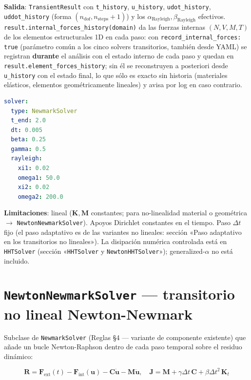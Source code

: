 \documentclass[11pt,oneside]{report}
\begin{document}
\textbf{Salida}: \texttt{TransientResult} con \texttt{t\_history}, \texttt{u\_history}, \texttt{udot\_history}, \texttt{uddot\_history} (forma $(n_{\text{dof}}, n_{\text{steps}} + 1)$) y los $\alpha_{\text{Rayleigh}}, \beta_{\text{Rayleigh}}$ efectivos. \texttt{result.\allowbreak{}internal\_\allowbreak{}forces\_\allowbreak{}history(domain)} da las fuerzas internas $(N, V, M, T)$ de los elementos estructurales 1D en cada paso: con \texttt{record\_\allowbreak{}internal\_\allowbreak{}forces: true} (parámetro común a los cinco solvers transitorios, también desde YAML) se registran \textbf{durante} el análisis con el estado interno de cada paso y quedan en \texttt{result.\allowbreak{}element\_\allowbreak{}forces\_\allowbreak{}history}; sin él se reconstruyen a posteriori desde \texttt{u\_history} con el estado final, lo que sólo es exacto sin historia (materiales elásticos, elementos geométricamente lineales) y avisa por log en caso contrario.

\begin{lstlisting}[language=yaml]
solver:
  type: NewmarkSolver
  t_end: 2.0
  dt: 0.005
  beta: 0.25
  gamma: 0.5
  rayleigh:
    xi1: 0.02
    omega1: 50.0
    xi2: 0.02
    omega2: 200.0

\end{lstlisting}

\textbf{Limitaciones}: lineal ($\mathbf K, \mathbf M$ constantes; para no-linealidad material o geométrica \ensuremath{\to} \texttt{NewtonNewmarkSolver}). Apoyos Dirichlet constantes en el tiempo. Paso $\Delta t$ fijo (el paso adaptativo es de las variantes no lineales: sección «Paso adaptativo en los transitorios no lineales»). La disipación numérica controlada está en \texttt{HHTSolver} (sección «\texttt{HHTSolver} y \texttt{NewtonHHTSolver}»); generalized-$\alpha$ no está incluido.

\section{\texttt{NewtonNewmarkSolver} --- transitorio no lineal Newton-Newmark}

Subclase de \texttt{NewmarkSolver} (Reglas §4 --- variante de componente existente) que añade un bucle Newton-Raphson dentro de cada paso temporal sobre el residuo dinámico:

\[
\mathbf R = \mathbf F_{\text{ext}}(t) - \mathbf F_{\text{int}}(\mathbf u) - \mathbf C\dot{\mathbf u} - \mathbf M\ddot{\mathbf u}, \quad \mathbf J = \mathbf M + \gamma\Delta t\,\mathbf C + \beta\Delta t^2\,\mathbf K_t
\]
\end{document}
